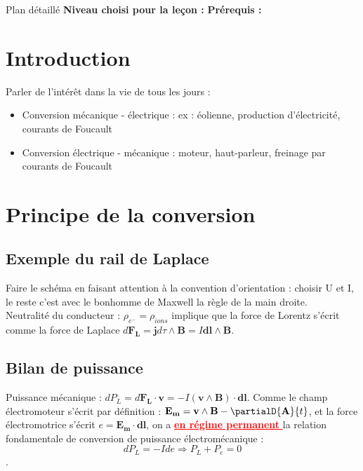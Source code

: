 \begin{reportBlock}{Plan détaillé}
  \textbf{Niveau choisi pour la leçon :} 
  \newline
  \textbf{Prérequis : }
  \newline

\section*{Introduction}
Parler de l'intérêt dans la vie de tous les jours :
\begin{itemize}
    \item Conversion mécanique - électrique : ex : éolienne, production d'électricité, courants de Foucault
    \item Conversion électrique - mécanique : moteur, haut-parleur, freinage par courants de Foucault
\end{itemize}

\section{Principe de la conversion}
\subsection{Exemple du rail de Laplace}
Faire le schéma en faisant attention à la convention d'orientation : choisir U et I, le reste c'est avec le bonhomme de Maxwell la règle de la main droite.\\

Neutralité du conducteur : $\rho_{e^-}=\rho_{ions}$ implique que la force de Lorentz s'écrit comme la force de Laplace $d\mathbf{F_{L}}=\mathbf{j}d\tau\wedge\mathbf{B}=I\mathbf{dl}\wedge\mathbf{B}$.\\

\subsection{Bilan de puissance}
Puissance mécanique : $dP_L = d\mathbf{F_{L}}\cdot\mathbf{v}=-I(\mathbf{v}\wedge\mathbf{B})\cdot\mathbf{dl}$. Comme le champ électromoteur s'écrit par définition : $\mathbf{E_m}=\mathbf{v}\wedge\mathbf{B}-\partialD{\mathbf{A}}{t}$, et la force électromotrice s'écrit $e=\mathbf{E_m}\cdot\mathbf{dl}$, on a \textcolor{red}{\underline{\textbf{en régime permanent }}} la relation fondamentale de conversion de puissance électromécanique :
\begin{equation}
    dP_L=-Ide\Rightarrow \boxed{P_{L} + P_{e} = 0}
\end{equation}
.


\end{reportBlock}
